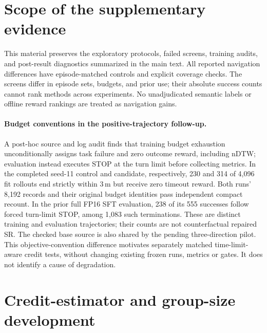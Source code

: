 \documentclass[10pt,twocolumn,letterpaper]{article}
\begin{document}
{\small


}

\clearpage
\appendix
\maketitlesupplementary

\section{Scope of the supplementary evidence}
This material preserves the exploratory protocols, failed screens,
training audits, and post-result diagnostics summarized in the main text.
All reported navigation differences have episode-matched controls and
explicit coverage checks. The screens differ in episode sets, budgets,
and prior use; their absolute success counts cannot rank methods across
experiments. No unadjudicated semantic labels or offline reward rankings
are treated as navigation gains.

\paragraph{Budget conventions in the positive-trajectory follow-up.}
A post-hoc source and log audit finds that training budget exhaustion
unconditionally assigns task failure and zero outcome reward, including
nDTW; evaluation instead executes STOP at the turn limit before collecting
metrics. In the completed seed-11 control and candidate, respectively,
230 and 314 of 4,096 fit rollouts end strictly within $3\,\mathrm{m}$
but receive zero timeout reward. Both runs' 8,192 records and their original
budget identities pass independent compact recount. In the prior full
FP16 SFT evaluation, 238 of its 555 successes follow forced turn-limit
STOP, among 1,083 such terminations. These are distinct training and
evaluation trajectories; their counts are not counterfactual repaired SR.
The checked base source is also shared by the pending three-direction
pilot. This objective-convention difference motivates separately matched
time-limit-aware credit tests, without changing existing frozen runs,
metrics or gates. It does not identify a cause of degradation.

\section{Credit-estimator and group-size development}
\label{sec:credit-followups}
\end{document}
